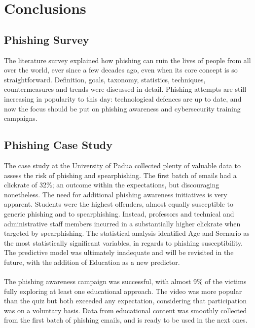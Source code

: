 \documentclass[a4paper]{article}
\begin{document}
\newpage

\section{Conclusions}

\subsection{Phishing Survey}

The literature survey explained how phishing can ruin the lives of people from all over the world, ever since a few decades ago, even when its core concept is so straightforward. Definition, goals, taxonomy, statistics, techniques, countermeasures and trends were discussed in detail. Phishing attempts are still increasing in popularity to this day: technological defences are up to date, and now the focus should be put on phishing awareness and cybersecurity training campaigns.

\subsection{Phishing Case Study}

The case study at the University of Padua collected plenty of valuable data to assess the risk of phishing and spearphishing. The first batch of emails had a clickrate of 32\%; an outcome within the expectations, but discouraging nonetheless. The need for additional phishing awareness initiatives is very apparent. Students were the highest offenders, almost equally susceptible to generic phishing and to spearphishing. Instead, professors and technical and administrative staff members incurred in a substantially higher clickrate when targeted by spearphishing. The statistical analysis identified Age and Scenario as the most statistically significant variables, in regards to phishing susceptibility. The predictive model was ultimately inadequate and will be revisited in the future, with the addition of Education as a new predictor.
\\ \\
The phishing awareness campaign was successful, with almost 9\% of the victims fully exploring at least one educational approach. The video was more popular than the quiz but both exceeded any expectation, considering that participation was on a voluntary basis. Data from educational content was smoothly collected from the first batch of phishing emails, and is ready to be used in the next ones.
\end{document}
